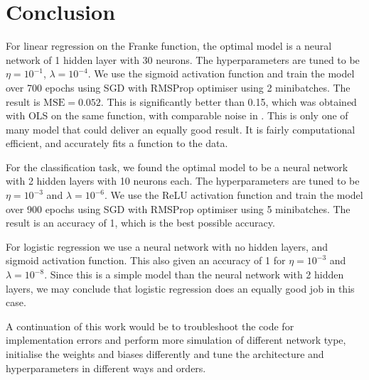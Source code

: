 \section{Conclusion}\label{sec:conclusion}

For linear regression on the Franke function, the optimal model is a neural network of 1 hidden layer with 30 neurons. The hyperparameters are tuned to be $\eta=10^{-1}$, $\lambda=10^{-4}$. We use the sigmoid activation function and train the model over 700 epochs using SGD with RMSProp optimiser using 2 minibatches. The result is $\mathrm{MSE} = 0.052$. This is significantly better than 0.15, which was obtained with OLS on the same function, with comparable noise in \projectOne. This is only one of many model that could deliver an equally good result. It is fairly computational efficient, and accurately fits a function to the data. 

For the classification task, we found the optimal model to be a neural network with 2 hidden layers with 10 neurons each. The hyperparameters are tuned to be $\eta=10^{-3}$ and $\lambda=10^{-6}$. We use the ReLU activation function and train the model over 900 epochs using SGD with RMSProp optimiser using 5 minibatches. The result is an accuracy of 1, which is the best possible accuracy. 

For logistic regression we use a neural network with no hidden layers, and sigmoid activation function. This also given an accuracy of 1 for $\eta=10^{-3}$ and $\lambda=10^{-8}$. Since this is a simple model than the neural network with 2 hidden layers, we may conclude that logistic regression does an equally good job in this case. 

A continuation of this work would be to troubleshoot the code for implementation errors and perform more simulation of different network type, initialise the weights and biases differently and tune the architecture and hyperparameters in different ways and orders. 